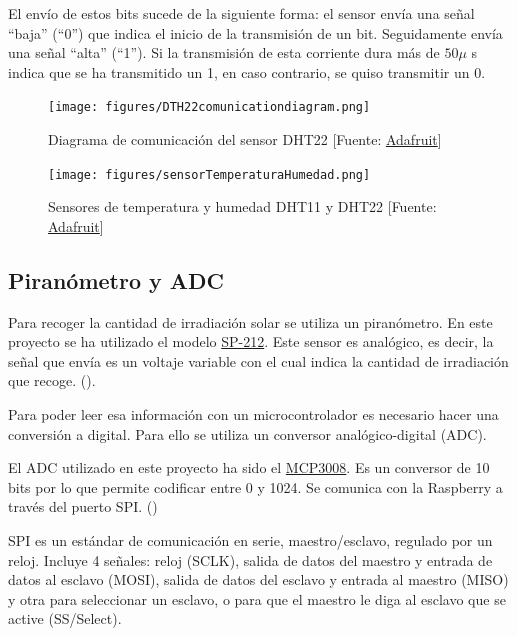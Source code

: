 El envío de estos bits sucede de la siguiente forma: el sensor envía una señal ``baja'' (``0'') que indica el inicio de la transmisión de un bit. Seguidamente envía una señal ``alta'' (``1''). Si la transmisión de esta corriente dura más de $ 50 \mu $ s indica que se ha transmitido un 1, en caso contrario, se quiso transmitir un 0.

\begin{figure}[htb]
	\begin{center}
		\texttt{[image: figures/DTH22comunicationdiagram.png]}
		\caption{Diagrama de comunicación del sensor DHT22 [Fuente: \href{https://cdn-shop.adafruit.com/datasheets/Digital+humidity+and+temperature+sensor+AM2302.pdf}{Adafruit}] \label{DHT22comunication}}
	\end{center}
\end{figure} 

 \begin{figure}[htb]
	\begin{center}
		\texttt{[image: figures/sensorTemperaturaHumedad.png]}
		\caption{Sensores de temperatura y humedad DHT11 y DHT22 [Fuente: \href{https://cdn-shop.adafruit.com/datasheets/Digital+humidity+and+temperature+sensor+AM2302.pdf}{Adafruit}] \label{sensor}}
	\end{center}
\end{figure} 

\subsection{Piranómetro y ADC}
\label{makereference2.2.3}
Para recoger la cantidad de irradiación solar se utiliza un piranómetro. En este proyecto se ha utilizado el modelo \href{https://www.apogeeinstruments.co.uk/content/SP-212-215-manual.pdf}{SP-212}. Este sensor es analógico, es decir, la señal que envía es un voltaje variable con el cual indica la cantidad de irradiación que recoge. (\cite{ARP:Apogee:2017}).

Para poder leer esa información con un microcontrolador es necesario hacer una conversión a digital. Para ello se utiliza un conversor analógico-digital (ADC).

El ADC utilizado en este proyecto ha sido el \href{https://cdn-shop.adafruit.com/datasheets/MCP3008.pdf}{MCP3008}. Es un conversor de 10 bits por lo que permite codificar entre 0 y 1024. Se comunica con la Raspberry a través del puerto SPI. (\cite{ARP:Adafruit:2017})

SPI es un estándar de comunicación en serie, maestro/esclavo, regulado por un reloj. Incluye 4 señales: reloj (SCLK), salida de datos del maestro y entrada de datos al esclavo (MOSI), salida de datos del esclavo y entrada al maestro (MISO) y otra para seleccionar un esclavo, o para que el maestro le diga al esclavo que se active (SS/Select).

